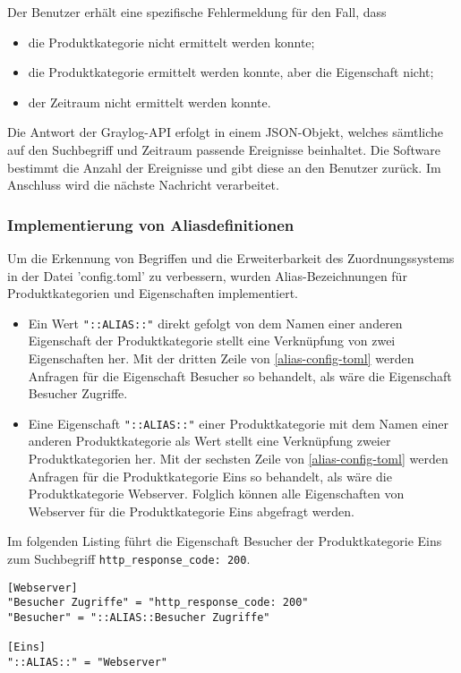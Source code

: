 Der Benutzer erhält eine spezifische Fehlermeldung für den Fall, dass

\begin{itemize}
\item die Produktkategorie nicht ermittelt werden konnte;
\item die Produktkategorie ermittelt werden konnte, aber die Eigenschaft nicht;
\item der Zeitraum nicht ermittelt werden konnte.
\end{itemize}

Die Antwort der Graylog-API erfolgt in einem JSON-Objekt, welches sämtliche auf den Suchbegriff und Zeitraum passende Ereignisse beinhaltet. Die Software bestimmt die Anzahl der Ereignisse und gibt diese an den Benutzer zurück. Im Anschluss wird die nächste Nachricht verarbeitet.

\subsubsection{Implementierung von Aliasdefinitionen}

Um die Erkennung von Begriffen und die Erweiterbarkeit des Zuordnungssystems in der Datei 'config.toml' zu verbessern, wurden Alias-Bezeichnungen für Produktkategorien und Eigenschaften implementiert. 

\begin{itemize}
\item Ein Wert \lstinline{"::ALIAS::"} direkt gefolgt von dem Namen einer anderen Eigenschaft der Produktkategorie stellt eine Verknüpfung von zwei Eigenschaften her. Mit der dritten Zeile von \autoref{alias-config-toml} werden Anfragen für die Eigenschaft Besucher so behandelt, als wäre die Eigenschaft Besucher Zugriffe.
\item Eine Eigenschaft \lstinline{"::ALIAS::"} einer Produktkategorie mit dem Namen einer anderen Produktkategorie als Wert stellt eine Verknüpfung zweier Produktkategorien her. Mit der sechsten Zeile  von \autoref{alias-config-toml} werden Anfragen für die Produktkategorie Eins so behandelt, als wäre die Produktkategorie Webserver. Folglich können alle Eigenschaften von Webserver für die Produktkategorie Eins abgefragt werden.
\end{itemize}

Im folgenden Listing führt die Eigenschaft Besucher der Produktkategorie Eins zum Suchbegriff \lstinline{http_response_code: 200}.

\begin{lstlisting}[caption={Aliasdefinitionen in der Datei config.toml}, label=alias-config-toml, xleftmargin=6mm]
[Webserver]
"Besucher Zugriffe" = "http_response_code: 200"
"Besucher" = "::ALIAS::Besucher Zugriffe"

[Eins]
"::ALIAS::" = "Webserver"
\end{lstlisting}
